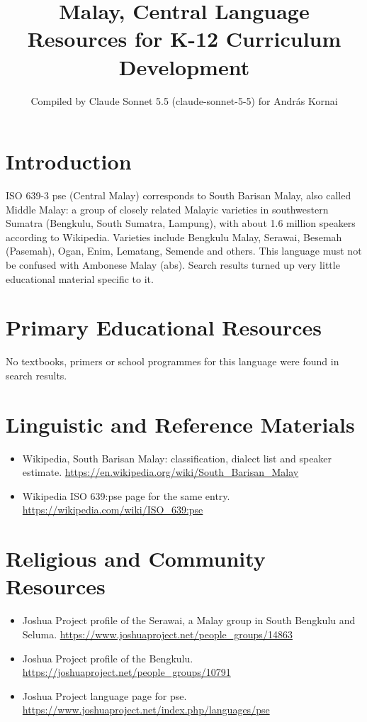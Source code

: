 \documentclass[12pt]{article}
\title{Malay, Central Language Resources for K-12 Curriculum Development}
\author{Compiled by Claude Sonnet 5.5 (claude-sonnet-5-5) for Andr\'as Kornai}
\date{}
\begin{document}
\maketitle

\section{Introduction}
ISO 639-3 pse (Central Malay) corresponds to South Barisan Malay, also called Middle Malay: a group of closely related Malayic varieties in southwestern Sumatra (Bengkulu, South Sumatra, Lampung), with about 1.6 million speakers according to Wikipedia. Varieties include Bengkulu Malay, Serawai, Besemah (Pasemah), Ogan, Enim, Lematang, Semende and others. This language must not be confused with Ambonese Malay (abs). Search results turned up very little educational material specific to it.

\section{Primary Educational Resources}
No textbooks, primers or school programmes for this language were found in search results.

\section{Linguistic and Reference Materials}
\begin{itemize}
\item Wikipedia, South Barisan Malay: classification, dialect list and speaker estimate. \url{https://en.wikipedia.org/wiki/South_Barisan_Malay}
\item Wikipedia ISO 639:pse page for the same entry. \url{https://wikipedia.com/wiki/ISO_639:pse}
\end{itemize}

\section{Religious and Community Resources}
\begin{itemize}
\item Joshua Project profile of the Serawai, a Malay group in South Bengkulu and Seluma. \url{https://www.joshuaproject.net/people_groups/14863}
\item Joshua Project profile of the Bengkulu. \url{https://joshuaproject.net/people_groups/10791}
\item Joshua Project language page for pse. \url{https://www.joshuaproject.net/index.php/languages/pse}
\end{itemize}
\end{document}
